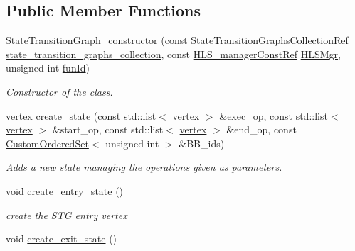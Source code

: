 \subsection*{Public Member Functions}
\begin{DoxyCompactItemize}
\item 
\hyperlink{classStateTransitionGraph__constructor_a30dedfe3edca3f9d0c9250d5fa367f71}{State\+Transition\+Graph\+\_\+constructor} (const \hyperlink{state__transition__graph_8hpp_a2613a37dfdde13c61d36bfaba91f433e}{State\+Transition\+Graphs\+Collection\+Ref} \hyperlink{classStateTransitionGraph__constructor_afe8681a397d20043b1c0910c29e9bdc9}{state\+\_\+transition\+\_\+graphs\+\_\+collection}, const \hyperlink{hls__manager_8hpp_a1b481383e3beabc89bd7562ae672dd8c}{H\+L\+S\+\_\+manager\+Const\+Ref} \hyperlink{classStateTransitionGraph__constructor_a7ff10711b43bdd70928e531ca60fbbb6}{H\+L\+S\+Mgr}, unsigned int \hyperlink{classStateTransitionGraph__constructor_a6468cf200b8eb5aea034ce1d7b9fbb61}{fun\+Id})
\begin{DoxyCompactList}\small\item\em Constructor of the class. \end{DoxyCompactList}\item 
\hyperlink{graph_8hpp_abefdcf0544e601805af44eca032cca14}{vertex} \hyperlink{classStateTransitionGraph__constructor_a196fb8190c401239b77cbceb52215d85}{create\+\_\+state} (const std\+::list$<$ \hyperlink{graph_8hpp_abefdcf0544e601805af44eca032cca14}{vertex} $>$ \&exec\+\_\+op, const std\+::list$<$ \hyperlink{graph_8hpp_abefdcf0544e601805af44eca032cca14}{vertex} $>$ \&start\+\_\+op, const std\+::list$<$ \hyperlink{graph_8hpp_abefdcf0544e601805af44eca032cca14}{vertex} $>$ \&end\+\_\+op, const \hyperlink{classCustomOrderedSet}{Custom\+Ordered\+Set}$<$ unsigned int $>$ \&B\+B\+\_\+ids)
\begin{DoxyCompactList}\small\item\em Adds a new state managing the operations given as parameters. \end{DoxyCompactList}\item 
void \hyperlink{classStateTransitionGraph__constructor_a5bf451d9586402376ceb07442838858a}{create\+\_\+entry\+\_\+state} ()
\begin{DoxyCompactList}\small\item\em create the S\+TG entry vertex \end{DoxyCompactList}\item 
void \hyperlink{classStateTransitionGraph__constructor_abe773f14021e94e12138829387c8fb54}{create\+\_\+exit\+\_\+state} ()

\end{DoxyCompactItemize}
